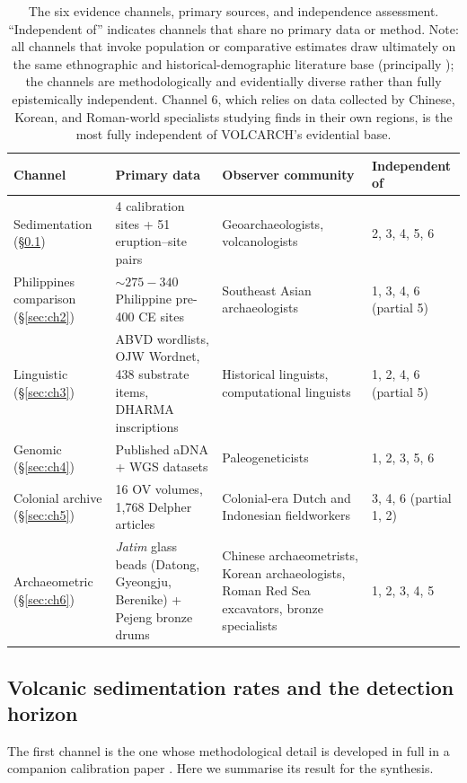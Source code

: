 \documentclass[12pt,a4paper]{article}
\begin{document}
\begin{table}[t]
\caption{The six evidence channels, primary sources, and independence assessment. ``Independent of'' indicates channels that share no primary data or method. Note: all channels that invoke population or comparative estimates draw ultimately on the same ethnographic and historical-demographic literature base (principally \citealp{bellwood2017,reid1988,kirch2000,higham2014}); the channels are methodologically and evidentially diverse rather than fully epistemically independent. Channel 6, which relies on data collected by Chinese, Korean, and Roman-world specialists studying finds in their own regions, is the most fully independent of VOLCARCH's evidential base.}
\label{tab:channels}
\begin{tabular}{p{2.5cm}p{4.5cm}p{4cm}p{3cm}}
\toprule
Channel & Primary data & Observer community & Independent of \\
\midrule
Sedimentation (\S\ref{sec:ch1}) & 4 calibration sites + 51 eruption--site pairs & Geoarchaeologists, volcanologists & 2, 3, 4, 5, 6 \\
Philippines comparison (\S\ref{sec:ch2}) & ${\sim}275{-}340$ Philippine pre-400 CE sites & Southeast Asian archaeologists & 1, 3, 4, 6 (partial 5) \\
Linguistic (\S\ref{sec:ch3}) & ABVD wordlists, OJW Wordnet, 438 substrate items, DHARMA inscriptions & Historical linguists, computational linguists & 1, 2, 4, 6 (partial 5) \\
Genomic (\S\ref{sec:ch4}) & Published aDNA + WGS datasets & Paleogeneticists & 1, 2, 3, 5, 6 \\
Colonial archive (\S\ref{sec:ch5}) & 16 OV volumes, 1{,}768 Delpher articles & Colonial-era Dutch and Indonesian fieldworkers & 3, 4, 6 (partial 1, 2) \\
Archaeometric (\S\ref{sec:ch6}) & \textit{Jatim} glass beads (Datong, Gyeongju, Berenike) + Pejeng bronze drums & Chinese archaeometrists, Korean archaeologists, Roman Red Sea excavators, bronze specialists & 1, 2, 3, 4, 5 \\
\bottomrule
\end{tabular}
\end{table}

\subsection{Volcanic sedimentation rates and the detection horizon}
\label{sec:ch1}

The first channel is the one whose methodological detail is developed in full in a companion calibration paper \citep{amien_p1core}. Here we summarise its result for the synthesis.
\end{document}
